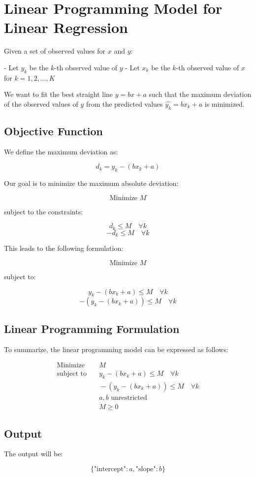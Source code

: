 \documentclass{article}
\begin{document}
\section*{Linear Programming Model for Linear Regression}

Given a set of observed values for \( x \) and \( y \):

- Let \( y_k \) be the \( k \)-th observed value of \( y \)
- Let \( x_k \) be the \( k \)-th observed value of \( x \) for \( k = 1, 2, \ldots, K \)

We want to fit the best straight line \( y = bx + a \) such that the maximum deviation of the observed values of \( y \) from the predicted values \( \hat{y_k} = bx_k + a \) is minimized.

\subsection*{Objective Function}

We define the maximum deviation as:

\[
d_k = y_k - (bx_k + a)
\]

Our goal is to minimize the maximum absolute deviation:

\[
\text{Minimize } M
\]

subject to the constraints:

\[
d_k \leq M \quad \forall k
\]
\[
-d_k \leq M \quad \forall k
\]

This leads to the following formulation:

\[
\text{Minimize } M
\]

subject to:

\[
y_k - (bx_k + a) \leq M \quad \forall k
\]
\[
-(y_k - (bx_k + a)) \leq M \quad \forall k
\]

\subsection*{Linear Programming Formulation}

To summarize, the linear programming model can be expressed as follows:

\begin{align*}
\text{Minimize} & \quad M \\
\text{subject to} & \quad y_k - (bx_k + a) \leq M \quad \forall k \\
& \quad -(y_k - (bx_k + a)) \leq M \quad \forall k \\
& \quad a, b \text{ unrestricted} \\
& \quad M \geq 0
\end{align*}

\subsection*{Output}

The output will be:

\[
\{
\text{"intercept"}: a,
\text{"slope"}: b
\}
\]
\end{document}
